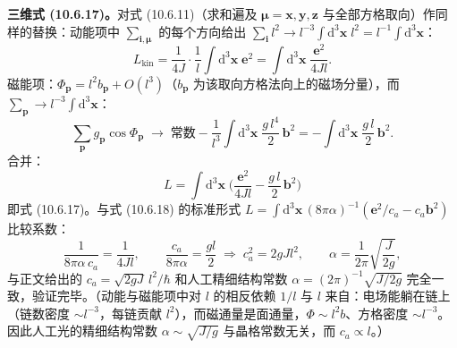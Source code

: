 \textbf{三维式 (10.6.17)。}对式 (10.6.11)（求和遍及 $\pmb\mu=\pmb x,\pmb y,\pmb z$ 与全部方格取向）作同样的替换：动能项中 $\sum_{\pmb i,\pmb\mu}$ 的每个方向给出 $\sum_{\pmb i}l^{2}\to l^{-3}\int\mathrm d^{3}\pmb x\;l^{2}=l^{-1}\int\mathrm d^{3}\pmb x$：
\begin{equation*}
L_{\text{kin}}=\frac{1}{4J}\cdot\frac1l\int\mathrm d^{3}\pmb x\;\pmb e^{2}=\int\mathrm d^{3}\pmb x\;\frac{\pmb e^{2}}{4Jl}.
\end{equation*}
磁能项：$\Phi_{\pmb p}=l^{2}b_{\pmb p}+O(l^{3})$（$b_{\pmb p}$ 为该取向方格法向上的磁场分量），而 $\sum_{\pmb p}\to l^{-3}\int\mathrm d^{3}\pmb x$：
\begin{equation*}
\sum_{\pmb p}g_{\pmb p}\cos\Phi_{\pmb p}\;\longrightarrow\;\text{常数}-\frac{1}{l^{3}}\int\mathrm d^{3}\pmb x\;\frac{g\,l^{4}}{2}\,\pmb b^{2}
=-\int\mathrm d^{3}\pmb x\;\frac{g\,l}{2}\,\pmb b^{2}.
\end{equation*}
合并：
\begin{equation*}
\boxed{\;L=\int\mathrm d^{3}\pmb x\;\Big(\frac{\pmb e^{2}}{4Jl}-\frac{g\,l}{2}\,\pmb b^{2}\Big)\;}
\end{equation*}
即式 (10.6.17)。与式 (10.6.18) 的标准形式 $L=\int\mathrm d^{3}\pmb x\,(8\pi\alpha)^{-1}(\pmb e^{2}/c_a-c_a\pmb b^{2})$ 比较系数：
\begin{equation*}
\frac{1}{8\pi\alpha\,c_a}=\frac{1}{4Jl},\qquad
\frac{c_a}{8\pi\alpha}=\frac{gl}{2}
\;\Longrightarrow\;
c_a^{2}=2gJl^{2},\qquad
\alpha=\frac{1}{2\pi}\sqrt{\frac{J}{2g}},
\end{equation*}
与正文给出的 $c_a=\sqrt{2gJ}\,l^{2}/\hbar$ 和人工精细结构常数 $\alpha=(2\pi)^{-1}\sqrt{J/2g}$ 完全一致，验证完毕。（动能与磁能项中对 $l$ 的相反依赖 $1/l$ 与 $l$ 来自：电场能躺在链上（链数密度 $\sim l^{-3}$，每链贡献 $l^{2}$），而磁通量是面通量，$\Phi\sim l^{2}b$、方格密度 $\sim l^{-3}$。因此人工光的精细结构常数 $\alpha\sim\sqrt{J/g}$ 与晶格常数无关，而 $c_a\propto l$。）




